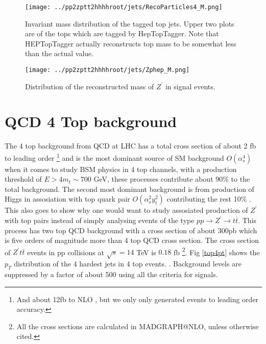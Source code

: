 \documentclass[12pt,a4paper]{article}		%
\begin{document}
\begin{figure}[h]
	\begin{centering}	
		\texttt{[image: ../pp2zptt2hhhhroot/jets/RecoParticles4\_M.png]} 
		\caption{ Invariant mass distribution of the tagged top jets.  Upper two plots are of the tops which are tagged by HepTopTagger. Note that HEPTopTagger actually reconstructs top mass to be somewhat less than the actual value.}
		\label{ttttm_reco}
		\centering
	\end{centering} 		
\end{figure} 
\newpage
\begin{figure}[h]
	\begin{centering}	
		\texttt{[image: ../pp2zptt2hhhhroot/jets/Zphep\_M.png]} 
		\caption{ Distribution of the reconstructed mass of $Z^\prime$ in signal events.} 
		\centering
	\end{centering} 		
\end{figure} 


\section{QCD 4 Top background}

The 4 top background from QCD at LHC has a total cross section of about 2 fb to leading order \footnote{And about 12fb to NLO , but we only only generated events to leading order accuracy.} and is the most dominant source of SM background $O (\alpha_s^4) $ when it comes to study BSM physics in 4 top channels, with a production threshold of $E > 4m_t \sim 700$ GeV, these processes contribute about 90\% to the total background. The second most dominant background is from production of Higgs in assosiation with top quark pair $O ( \alpha_s^2 y_t^2 )$ contributing the rest 10\% . This also goes to show why one would want to study assosiated production of $Z^\prime$ with top pairs instead of simply analysing events of the type $pp \to Z^\prime \to t \bar{t}$. This process has two top QCD background with a cross section of about 300pb \cite{topcsx} which is five orders of magnitude more than 4 top QCD cross section.  The cross section of $Z^\prime t \bar{t}$ events in pp collisions at $\sqrt{s} = 14$ TeV is $0.18$ fb \footnote{All the cross sections are calculated in MADGRAPH@NLO, unless otherwise cited.}. Fig \ref{top4pt} shows the $p_T$ distribution of the 4 hardest jets in 4 top events. \cite{topjetLHC}. Background levels are suppressed by a factor of about 500 using all the criteria for signals.   
\end{document}
